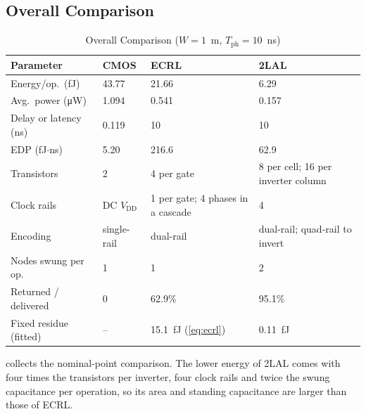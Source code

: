 \documentclass[conference]{IEEEtran}
\newcommand{\VDD}{V_{\mathrm{DD}}}
\newcommand{\Tph}{T_{\mathrm{ph}}}
\begin{document}
\subsection{Overall Comparison}
\begin{table}[!t]
\caption{Overall Comparison ($W=1$~\textmu m, $\Tph=10$~ns)}
\label{tab:summary}
\centering
\setlength{\tabcolsep}{3pt}
\begin{tabular}{@{}L{0.30\columnwidth}L{0.14\columnwidth}L{0.22\columnwidth}L{0.24\columnwidth}@{}}
\toprule
\textbf{Parameter} & \textbf{CMOS} & \textbf{ECRL} & \textbf{2LAL} \\
\midrule
Energy/op.\ (fJ)          & 43.77 & 21.66 & 6.29 \\
Avg.\ power (\si{\micro\watt}) & 1.094 & 0.541 & 0.157 \\
Delay or latency (ns)     & 0.119 & 10 & 10 \\
EDP (fJ$\cdot$ns)         & 5.20 & 216.6 & 62.9 \\
Transistors               & 2 & 4 per gate & 8 per cell; 16 per inverter column \\
Clock rails               & DC $\VDD$ & 1 per gate; 4 phases in a cascade & 4 \\
Encoding                  & single-rail & dual-rail & dual-rail; quad-rail to invert \\
Nodes swung per op.       & 1 & 1 & 2 \\
Returned / delivered      & 0 & 62.9\% & 95.1\% \\
Fixed residue (fitted)    & -- & 15.1~fJ (\cref{eq:ecrl}) & 0.11~fJ \\
\bottomrule
\end{tabular}
\end{table}
 collects the nominal-point comparison. The lower energy of
2LAL comes with four times the transistors per inverter, four clock rails and
twice the swung capacitance per operation, so its area and standing
capacitance are larger than those of ECRL.
\end{document}
